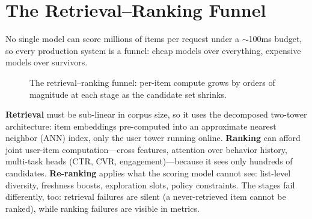 \section{The Retrieval--Ranking Funnel}
\label{sec:recsys_bridge_funnel}

No single model can score millions of items per request under a $\sim$100ms budget, so every production system is a funnel: cheap models over everything, expensive models over survivors.

\begin{figure}[H]
\centering
{}
\caption{The retrieval--ranking funnel: per-item compute grows by orders of magnitude at each stage as the candidate set shrinks.}
\label{fig:recsys_bridge_funnel}
\end{figure}

\textbf{Retrieval} must be sub-linear in corpus size, so it uses the decomposed two-tower architecture: item embeddings pre-computed into an approximate nearest neighbor (ANN) index, only the user tower running online. \textbf{Ranking} can afford joint user-item computation---cross features, attention over behavior history, multi-task heads (CTR, CVR, engagement)---because it sees only hundreds of candidates. \textbf{Re-ranking} applies what the scoring model cannot see: list-level diversity, freshness boosts, exploration slots, policy constraints. The stages fail differently, too: retrieval failures are silent (a never-retrieved item cannot be ranked), while ranking failures are visible in metrics.

